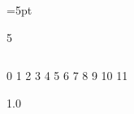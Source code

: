 
\def\macro{\abovedisplayskip}=5pt

\def\macro{\abovedisplayskip=}5



$$

  0 1 2 3 4 5 6 7 8 9 10 11

  1.0

